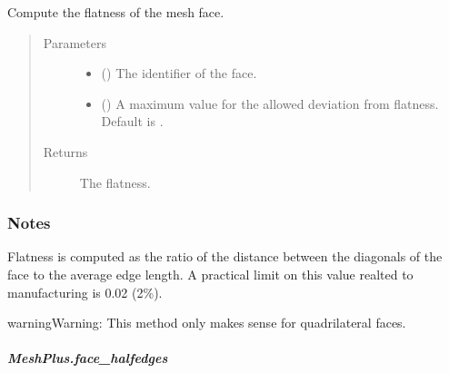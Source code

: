 \documentclass[letterpaper,10pt,english]{sphinxmanual}
\begin{document}
\begin{fulllineitems}
\begin{fulllineitems}
\label{\detokenize{api/generated/directional_clustering.mesh.MeshPlus.face_flatness:directional_clustering.mesh.MeshPlus.face_flatness}}
Compute the flatness of the mesh face.
\begin{quote}\begin{description}
\item[{Parameters}] \leavevmode\begin{itemize}
\item {} 
 () \textendash{} The identifier of the face.

\item {} 
 () \textendash{} A maximum value for the allowed deviation from flatness.
Default is .

\end{itemize}

\item[{Returns}] \leavevmode
{} \textendash{} The flatness.

\end{description}\end{quote}
\subsubsection*{Notes}

Flatness is computed as the ratio of the distance between the diagonals
of the face to the average edge length. A practical limit on this value
realted to manufacturing is 0.02 (2\%).

\begin{sphinxadmonition}{warning}{Warning:}
This method only makes sense for quadrilateral faces.
\end{sphinxadmonition}

\end{fulllineitems}



\subparagraph{MeshPlus.face\_halfedges}
\label{\detokenize{api/generated/directional_clustering.mesh.MeshPlus.face_halfedges:meshplus-face-halfedges}}\label{\detokenize{api/generated/directional_clustering.mesh.MeshPlus.face_halfedges::doc}}


\end{fulllineitems}
\end{document}

